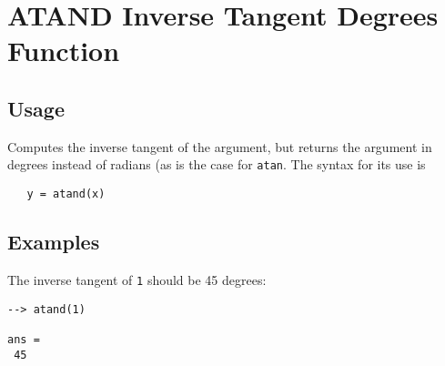 \section{ATAND Inverse Tangent Degrees Function}

\subsection{Usage}

Computes the inverse tangent of the argument, but returns
the argument in degrees instead of radians (as is the case
for \verb|atan|. The syntax for its use is
\begin{verbatim}
   y = atand(x)
\end{verbatim}
\subsection{Examples}

The inverse tangent of \verb|1| should be 45 degrees:
\begin{verbatim}
--> atand(1)

ans = 
 45 
\end{verbatim}
